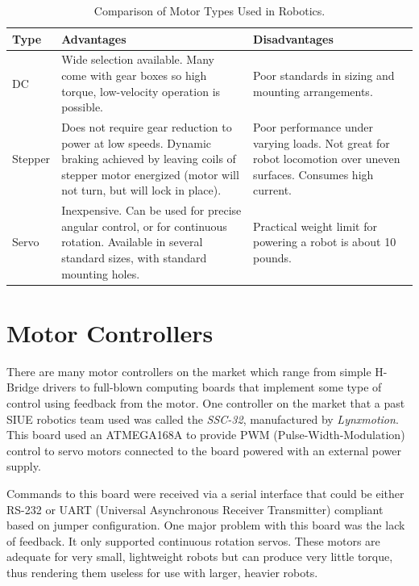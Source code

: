 \documentclass[12pt,oneside,final]{siuethesis}
\theoremstyle{definition}
\begin{document}
\begin{table}[htbp!]
\begin{center}
\begin{tabular}{|p{0.75in}|p{2.5in}|p{2.5in}|}
\hline
Type & 
Advantages & 
Disadvantages\\
\hline
DC & 
Wide selection available. Many come with gear boxes so high torque, low-velocity operation is possible. & 
Poor standards in sizing and mounting arrangements.\\
\hline
Stepper & 
Does not require gear reduction to power at low speeds. Dynamic braking achieved by leaving coils of stepper motor energized (motor will not turn, but will lock in place).& 
Poor performance under varying loads. Not great for robot locomotion over uneven surfaces. Consumes high current.\\
\hline
Servo & 
Inexpensive. Can be used for precise angular control, or for continuous rotation. Available in several standard sizes, with standard mounting holes. & 
Practical weight limit for powering a robot is about 10 pounds.\\
\hline
\end{tabular}
\caption{Comparison of Motor Types Used in Robotics.}
\label{Tab:Motor_Types}
\end{center}
\end{table}


\section{Motor Controllers} 

There are many motor controllers on the market which range from simple H-Bridge drivers to full-blown computing boards that implement some type of control using feedback from the motor. One controller on the market that a past SIUE robotics team used was called the \emph{SSC-32}, manufactured by \emph{Lynxmotion}. This board used an ATMEGA168A to provide PWM (Pulse-Width-Modulation) control to servo motors connected to the board powered with an external power supply.

Commands to this board were received via a serial interface that could be either RS-232 or UART (Universal Asynchronous Receiver Transmitter) compliant based on jumper configuration. One major problem with this board was the lack of feedback. It only supported continuous rotation servos. These motors are adequate for very small, lightweight robots but can produce very little torque, thus rendering them useless for use with larger, heavier robots.
	
\end{document}
